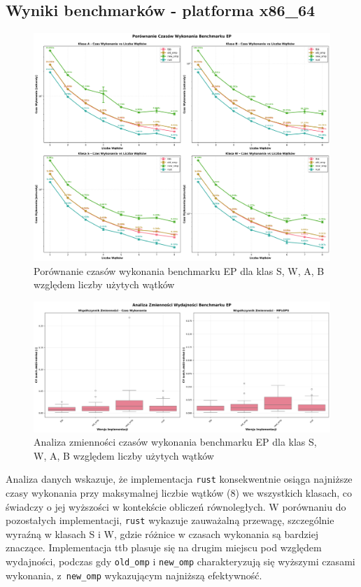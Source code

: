 \subsection{Wyniki benchmarków - platforma x86\_64}
\begin{figure}[H]
    \centering
    \includegraphics[width=\textwidth]{analiza/images/parallel/ep/x86/ep_porownanie_czasow_wykonania.png}
    \caption{Porównanie czasów wykonania benchmarku EP dla klas S, W, A, B względem liczby użytych wątków}
    \label{ep_porownanie_czasow_wykonania_x86_64}
\end{figure}

\begin{figure}[H]
    \centering
    \includegraphics[width=\textwidth]{analiza/images/parallel/ep/x86/ep_analiza_zmiennosci.png}
    \caption{Analiza zmienności czasów wykonania benchmarku EP dla klas S, W, A, B względem liczby użytych wątków}
    \label{ep_analiza_zmiennosci_x86_64}
\end{figure}

Analiza danych wskazuje, że implementacja \texttt{rust} konsekwentnie osiąga najniższe czasy wykonania przy maksymalnej liczbie wątków (8) we wszystkich klasach, co świadczy o jej wyższości w kontekście obliczeń równoległych.
W porównaniu do pozostałych implementacji, \texttt{rust} wykazuje zauważalną przewagę, szczególnie wyraźną w klasach S i W, gdzie różnice w czasach wykonania są bardziej znaczące. Implementacja ttb plasuje się na drugim miejscu pod względem wydajności, podczas gdy \texttt{old\_omp} i \texttt{new\_omp} charakteryzują się wyższymi czasami wykonania, z~\texttt{new\_omp} wykazującym najniższą efektywność.

